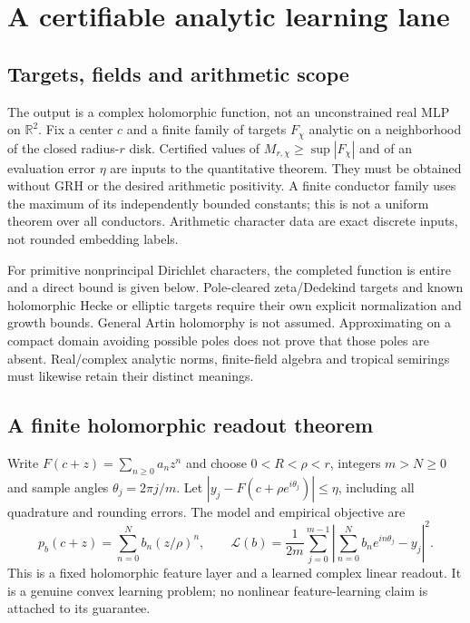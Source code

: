 \documentclass[11pt,oneside,openany]{book}
\theoremstyle{definition}\newtheorem{definition}[theorem]{Definition}
\theoremstyle{remark}\newtheorem{remark}[theorem]{Remark}
\begin{document}
\section{A certifiable analytic learning lane}
\subsection{Targets, fields and arithmetic scope}
The output is a complex holomorphic function, not an unconstrained real MLP
on $\mathbb R^2$. Fix a center $c$ and a finite family of targets $F_\chi$
analytic on a neighborhood of the closed radius-$r$ disk. Certified values
of $M_{r,\chi}\ge\sup|F_\chi|$ and of an evaluation error $\eta$ are inputs
to the quantitative theorem. They must be obtained without GRH or the desired
arithmetic positivity. A finite conductor family uses the maximum of its
independently bounded constants; this is not a uniform theorem over all
conductors. Arithmetic character data are exact discrete inputs, not rounded
embedding labels.

For primitive nonprincipal Dirichlet characters, the completed function is
entire and a direct bound is given below. Pole-cleared zeta/Dedekind targets
and known holomorphic Hecke or elliptic targets require their own explicit
normalization and growth bounds. General Artin holomorphy is not assumed.
Approximating on a compact domain avoiding possible poles does not prove that
those poles are absent. Real/complex analytic norms, finite-field algebra and
tropical semirings must likewise retain their distinct meanings.

\subsection{A finite holomorphic readout theorem}
Write $F(c+z)=\sum_{n\ge0}a_nz^n$ and choose
$0<R<\rho<r$, integers $m>N\ge0$ and sample angles $\theta_j=2\pi j/m$.
Let $|y_j-F(c+\rho e^{i\theta_j})|\le\eta$, including all quadrature and
rounding errors. The model and empirical objective are
\[
 p_b(c+z)=\sum_{n=0}^N b_n(z/\rho)^n,\qquad
 \mathcal L(b)=\frac1{2m}\sum_{j=0}^{m-1}
 \left|\sum_{n=0}^Nb_ne^{in\theta_j}-y_j\right|^2.
\]
This is a fixed holomorphic feature layer and a learned complex linear
readout. It is a genuine convex learning problem; no nonlinear feature-learning
claim is attached to its guarantee.
\end{document}
